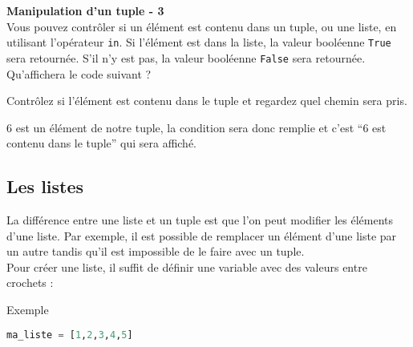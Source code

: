     \begin{Exercice}[5 minutes] \textbf{Manipulation d'un tuple - 3}\\
        Vous pouvez contrôler si un élément est contenu dans un tuple, ou une liste, en utilisant l'opérateur \lstinline{in}. Si l'élément est dans la liste, la valeur booléenne \lstinline{True} sera retournée. S'il n'y est pas, la valeur booléenne \lstinline{False} sera retournée. \\
        
        Qu'affichera le code suivant ? \\
        
        
    
        \begin{conseil}
            Contrôlez si l'élément est contenu dans le tuple et regardez quel chemin sera pris.
        \end{conseil}
        
        \begin{solution}
            6 est un élément de notre tuple, la condition sera donc remplie et c'est ``6 est contenu dans le tuple'' qui sera affiché.
        \end{solution}
    \end{Exercice}
    
    \subsection{Les listes}
    La différence entre une liste et un tuple est que l'on peut modifier les éléments d'une liste. Par exemple, il est possible de remplacer un élément d'une liste par un autre tandis qu'il est impossible de le faire avec un tuple.
    \\
    Pour créer une liste, il suffit de définir une variable avec des valeurs entre crochets :
    \begin{Example}{\faTerminal \quad Exemple}
        \begin{lstlisting}[language=Python]
            ma_liste = [1,2,3,4,5]   \end{lstlisting}
    \end{Example}
    
